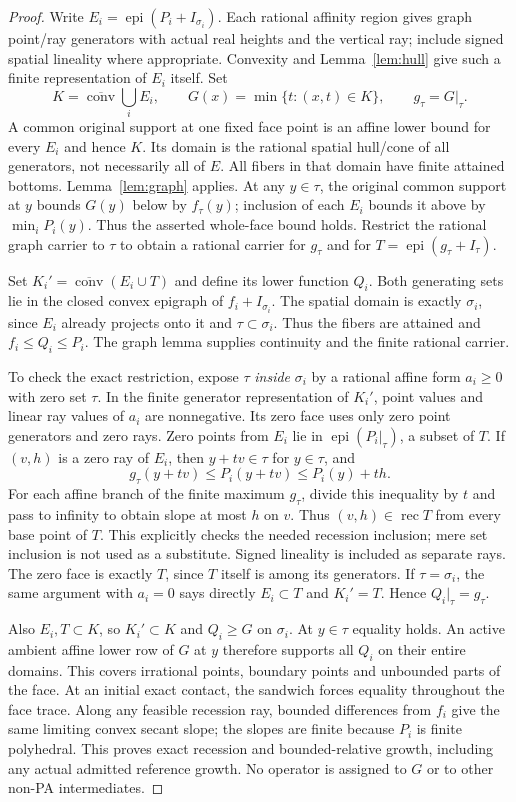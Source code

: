 \documentclass[11pt]{article}
\newcommand{\epi}{\operatorname{epi}}
\newcommand{\rec}{\operatorname{rec}}
\newcommand{\clconv}{\overline{\operatorname{conv}}}
\begin{document}
\begin{proof}
Write $E_i=\epi(P_i+I_{\sigma_i})$. Each rational affinity region gives graph point/ray generators with actual real heights and the vertical ray; include signed spatial lineality where appropriate. Convexity and Lemma~\ref{lem:hull} give such a finite representation of $E_i$ itself. Set
\[
 K=\clconv\bigcup_i E_i,\qquad G(x)=\min\{t:(x,t)\in K\},\qquad g_\tau=G|_\tau.
\]
A common original support at one fixed face point is an affine lower bound for every $E_i$ and hence $K$. Its domain is the rational spatial hull/cone of all generators, not necessarily all of $E$. All fibers in that domain have finite attained bottoms. Lemma~\ref{lem:graph} applies. At any $y\in\tau$, the original common support at $y$ bounds $G(y)$ below by $f_\tau(y)$; inclusion of each $E_i$ bounds it above by $\min_i P_i(y)$. Thus the asserted whole-face bound holds. Restrict the rational graph carrier to $\tau$ to obtain a rational carrier for $g_\tau$ and for $T=\epi(g_\tau+I_\tau)$.

Set $K_i'=\clconv(E_i\cup T)$ and define its lower function $Q_i$. Both generating sets lie in the closed convex epigraph of $f_i+I_{\sigma_i}$. The spatial domain is exactly $\sigma_i$, since $E_i$ already projects onto it and $\tau\subset\sigma_i$. Thus the fibers are attained and $f_i\leq Q_i\leq P_i$. The graph lemma supplies continuity and the finite rational carrier.

To check the exact restriction, expose $\tau$ \emph{inside} $\sigma_i$ by a rational affine form $a_i\geq0$ with zero set $\tau$. In the finite generator representation of $K_i'$, point values and linear ray values of $a_i$ are nonnegative. Its zero face uses only zero point generators and zero rays. Zero points from $E_i$ lie in $\epi(P_i|_\tau)$, a subset of $T$. If $(v,h)$ is a zero ray of $E_i$, then $y+tv\in\tau$ for $y\in\tau$, and
\[
 g_\tau(y+tv)\leq P_i(y+tv)\leq P_i(y)+th.
\]
For each affine branch of the finite maximum $g_\tau$, divide this inequality by $t$ and pass to infinity to obtain slope at most $h$ on $v$. Thus $(v,h)\in\rec T$ from every base point of $T$. This explicitly checks the needed recession inclusion; mere set inclusion is not used as a substitute. Signed lineality is included as separate rays. The zero face is exactly $T$, since $T$ itself is among its generators. If $\tau=\sigma_i$, the same argument with $a_i=0$ says directly $E_i\subset T$ and $K_i'=T$. Hence $Q_i|_\tau=g_\tau$.

Also $E_i,T\subset K$, so $K_i'\subset K$ and $Q_i\geq G$ on $\sigma_i$. At $y\in\tau$ equality holds. An active ambient affine lower row of $G$ at $y$ therefore supports all $Q_i$ on their entire domains. This covers irrational points, boundary points and unbounded parts of the face. At an initial exact contact, the sandwich forces equality throughout the face trace. Along any feasible recession ray, bounded differences from $f_i$ give the same limiting convex secant slope; the slopes are finite because $P_i$ is finite polyhedral. This proves exact recession and bounded-relative growth, including any actual admitted reference growth. No operator is assigned to $G$ or to other non-PA intermediates.
\end{proof}
\end{document}
